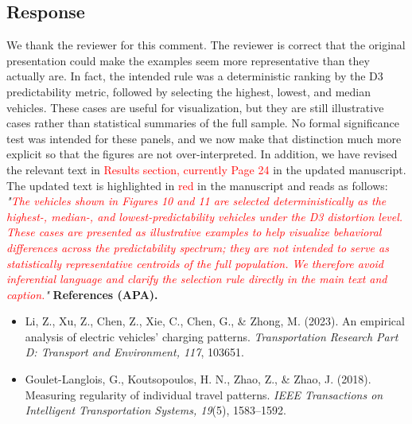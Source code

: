 \documentclass{NSF}
\begin{document}
\subsection{Response}
We thank the reviewer for this comment. The reviewer is correct that the original presentation could make the examples seem more representative than they actually are. In fact, the intended rule was a deterministic ranking by the D3 predictability metric, followed by selecting the highest, lowest, and median vehicles. These cases are useful for visualization, but they are still illustrative cases rather than statistical summaries of the full sample. No formal significance test was intended for these panels, and we now make that distinction much more explicit so that the figures are not over-interpreted.
\noindent In addition, we have revised the relevant text in \textcolor{red}{Results section, currently Page 24} in the updated manuscript. The updated text is highlighted in \textcolor{red}{red} in the manuscript and reads as follows:
\vskip 0.1cm
\noindent \textit{"\textcolor{red}{The vehicles shown in Figures 10 and 11 are selected deterministically as the highest-, median-, and lowest-predictability vehicles under the D3 distortion level. These cases are presented as illustrative examples to help visualize behavioral differences across the predictability spectrum; they are not intended to serve as statistically representative centroids of the full population. We therefore avoid inferential language and clarify the selection rule directly in the main text and caption.}"}
\vskip 0.05in
\noindent\textbf{References (APA).}
\begin{itemize}
    \item Li, Z., Xu, Z., Chen, Z., Xie, C., Chen, G., \& Zhong, M. (2023). An empirical analysis of electric vehicles' charging patterns. \textit{Transportation Research Part D: Transport and Environment, 117}, 103651.
    \item Goulet-Langlois, G., Koutsopoulos, H. N., Zhao, Z., \& Zhao, J. (2018). Measuring regularity of individual travel patterns. \textit{IEEE Transactions on Intelligent Transportation Systems, 19}(5), 1583--1592.
\end{itemize}
\end{document}
